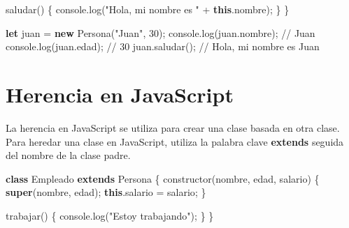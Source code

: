 \documentclass[
  a4paper,
  DIV=11,
  numbers=noendperiod,
  onepage,
  openany]{scrreprt}
\newenvironment{Shaded}{\begin{snugshade}}{\end{snugshade}}
\newcommand{\AttributeTok}[1]{\textcolor[rgb]{0.40,0.45,0.13}{#1}}
\newcommand{\BuiltInTok}[1]{\textcolor[rgb]{0.00,0.23,0.31}{#1}}
\newcommand{\CommentTok}[1]{\textcolor[rgb]{0.37,0.37,0.37}{#1}}
\newcommand{\DecValTok}[1]{\textcolor[rgb]{0.68,0.00,0.00}{#1}}
\newcommand{\FunctionTok}[1]{\textcolor[rgb]{0.28,0.35,0.67}{#1}}
\newcommand{\KeywordTok}[1]{\textcolor[rgb]{0.00,0.23,0.31}{\textbf{#1}}}
\newcommand{\NormalTok}[1]{\textcolor[rgb]{0.00,0.23,0.31}{#1}}
\newcommand{\OperatorTok}[1]{\textcolor[rgb]{0.37,0.37,0.37}{#1}}
\newcommand{\StringTok}[1]{\textcolor[rgb]{0.13,0.47,0.30}{#1}}
\begin{document}
\begin{tcolorbox}
\begin{Shaded}
\begin{Highlighting}[]
    \FunctionTok{saludar}\NormalTok{() \{}
        \BuiltInTok{console}\OperatorTok{.}\FunctionTok{log}\NormalTok{(}\StringTok{"Hola, mi nombre es "} \OperatorTok{+} \KeywordTok{this}\OperatorTok{.}\AttributeTok{nombre}\NormalTok{)}\OperatorTok{;}
\NormalTok{    \}}
\NormalTok{\}}

\KeywordTok{let}\NormalTok{ juan }\OperatorTok{=} \KeywordTok{new} \FunctionTok{Persona}\NormalTok{(}\StringTok{"Juan"}\OperatorTok{,} \DecValTok{30}\NormalTok{)}\OperatorTok{;}
\BuiltInTok{console}\OperatorTok{.}\FunctionTok{log}\NormalTok{(juan}\OperatorTok{.}\AttributeTok{nombre}\NormalTok{)}\OperatorTok{;} \CommentTok{// Juan}
\BuiltInTok{console}\OperatorTok{.}\FunctionTok{log}\NormalTok{(juan}\OperatorTok{.}\AttributeTok{edad}\NormalTok{)}\OperatorTok{;} \CommentTok{// 30}
\NormalTok{juan}\OperatorTok{.}\FunctionTok{saludar}\NormalTok{()}\OperatorTok{;} \CommentTok{// Hola, mi nombre es Juan}
\end{Highlighting}
\end{Shaded}

\section{Herencia en JavaScript}\label{herencia-en-javascript}

La herencia en JavaScript se utiliza para crear una clase basada en otra
clase. Para heredar una clase en JavaScript, utiliza la palabra clave
\textbf{extends} seguida del nombre de la clase padre.

\begin{Shaded}
\begin{Highlighting}[]
\KeywordTok{class}\NormalTok{ Empleado }\KeywordTok{extends}\NormalTok{ Persona \{}
    \FunctionTok{constructor}\NormalTok{(nombre}\OperatorTok{,}\NormalTok{ edad}\OperatorTok{,}\NormalTok{ salario) \{}
        \KeywordTok{super}\NormalTok{(nombre}\OperatorTok{,}\NormalTok{ edad)}\OperatorTok{;}
        \KeywordTok{this}\OperatorTok{.}\AttributeTok{salario} \OperatorTok{=}\NormalTok{ salario}\OperatorTok{;}
\NormalTok{    \}}

    \FunctionTok{trabajar}\NormalTok{() \{}
        \BuiltInTok{console}\OperatorTok{.}\FunctionTok{log}\NormalTok{(}\StringTok{"Estoy trabajando"}\NormalTok{)}\OperatorTok{;}
\NormalTok{    \}}
\NormalTok{\}}


\end{Highlighting}
\end{Shaded}
\end{tcolorbox}
\end{document}
